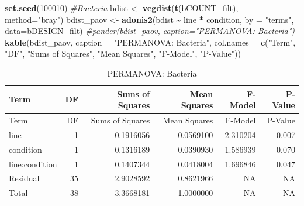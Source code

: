 \documentclass[
  11pt,
]{article}
\newenvironment{Shaded}{\begin{snugshade}}{\end{snugshade}}
\newcommand{\AttributeTok}[1]{\textcolor[rgb]{0.13,0.29,0.53}{#1}}
\newcommand{\CommentTok}[1]{\textcolor[rgb]{0.56,0.35,0.01}{\textit{#1}}}
\newcommand{\DecValTok}[1]{\textcolor[rgb]{0.00,0.00,0.81}{#1}}
\newcommand{\FunctionTok}[1]{\textcolor[rgb]{0.13,0.29,0.53}{\textbf{#1}}}
\newcommand{\NormalTok}[1]{#1}
\newcommand{\OtherTok}[1]{\textcolor[rgb]{0.56,0.35,0.01}{#1}}
\newcommand{\SpecialCharTok}[1]{\textcolor[rgb]{0.81,0.36,0.00}{\textbf{#1}}}
\newcommand{\StringTok}[1]{\textcolor[rgb]{0.31,0.60,0.02}{#1}}
\begin{document}
\begin{Shaded}
\begin{Highlighting}[]
\FunctionTok{set.seed}\NormalTok{(}\DecValTok{100010}\NormalTok{)}
\CommentTok{\#Bacteria}
\NormalTok{bdist }\OtherTok{\textless{}{-}} \FunctionTok{vegdist}\NormalTok{(}\FunctionTok{t}\NormalTok{(bCOUNT\_filt), }\AttributeTok{method=}\StringTok{"bray"}\NormalTok{)}
\NormalTok{bdist\_paov }\OtherTok{\textless{}{-}} \FunctionTok{adonis2}\NormalTok{(bdist }\SpecialCharTok{\textasciitilde{}}\NormalTok{ line }\SpecialCharTok{*}\NormalTok{ condition, }\AttributeTok{by =} \StringTok{"terms"}\NormalTok{, }\AttributeTok{data=}\NormalTok{bDESIGN\_filt)}
\CommentTok{\#pander(bdist\_paov, caption="PERMANOVA: Bacteria")}
\FunctionTok{kable}\NormalTok{(bdist\_paov, }\AttributeTok{caption =} \StringTok{"PERMANOVA: Bacteria"}\NormalTok{,}
      \AttributeTok{col.names =} \FunctionTok{c}\NormalTok{(}\StringTok{"Term"}\NormalTok{, }\StringTok{"DF"}\NormalTok{, }\StringTok{"Sums of Squares"}\NormalTok{, }\StringTok{"Mean Squares"}\NormalTok{, }\StringTok{"F{-}Model"}\NormalTok{, }\StringTok{"P{-}Value"}\NormalTok{))}
\end{Highlighting}
\end{Shaded}

\begin{longtable}[]{@{}lrrrrr@{}}
\caption{PERMANOVA: Bacteria}\tabularnewline
\toprule\noalign{}
Term & DF & Sums of Squares & Mean Squares & F-Model & P-Value \\
\midrule\noalign{}
\endfirsthead
\toprule\noalign{}
Term & DF & Sums of Squares & Mean Squares & F-Model & P-Value \\
\midrule\noalign{}
\endhead
\bottomrule\noalign{}
\endlastfoot
line & 1 & 0.1916056 & 0.0569100 & 2.310204 & 0.007 \\
condition & 1 & 0.1316189 & 0.0390930 & 1.586939 & 0.070 \\
line:condition & 1 & 0.1407344 & 0.0418004 & 1.696846 & 0.047 \\
Residual & 35 & 2.9028592 & 0.8621966 & NA & NA \\
Total & 38 & 3.3668181 & 1.0000000 & NA & NA \\
\end{longtable}
\end{document}
